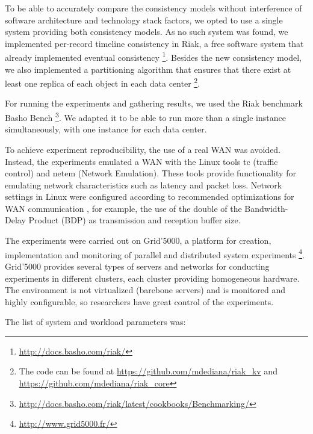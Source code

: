 \documentclass[man,floatsintext,12pt]{apa6}
\begin{document}
To be able to accurately compare the consistency models without interference of
software architecture and technology stack factors, we opted to use a single
system providing both consistency models. As no such system was found, we
implemented per-record timeline consistency in Riak, a free software system
that already implemented eventual consistency
\footnote{\url{http://docs.basho.com/riak/}}. Besides the new
consistency model, we also implemented a partitioning algorithm that ensures
that there exist at least one replica of each object in each data center
\footnote{The code can be found at \url{https://github.com/mdediana/riak_kv}
and \url{https://github.com/mdediana/riak_core}}.

For running the experiments and gathering results, we used the Riak benchmark
Basho Bench \footnote{\url{http://docs.basho.com/riak/latest/cookbooks/Benchmarking/}}.
We adapted it to be able to run more than a single instance simultaneously,
with one instance for each data center.

To achieve experiment reproducibility, the use of a real WAN was avoided.
Instead, the experiments emulated a WAN with the Linux tools tc (traffic
control) and netem (Network Emulation). These tools provide functionality for
emulating network characteristics such as latency and packet loss. Network
settings in Linux were configured according to recommended optimizations for
WAN communication \parencite{ESnet2012}, for example, the use of the double of the
Bandwidth-Delay Product (BDP) as transmission and reception buffer size.

The experiments were carried out on Grid'5000, a platform for creation,
implementation and monitoring of parallel and distributed system experiments
\footnote{\url{http://www.grid5000.fr/}}. Grid'5000 provides several types of
servers and networks for conducting experiments in different clusters, each
cluster providing homogeneous hardware. The environment is not virtualized
(barebone servers) and is monitored and highly configurable, so researchers
have great control of the experiments.

The list of system and workload parameters was:
\end{document}
